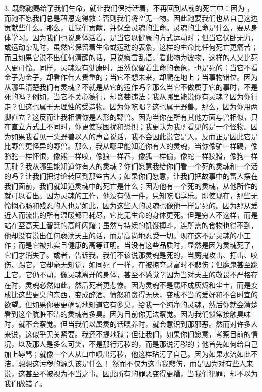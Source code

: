 3. 既然祂赐给了我们生命，就让我们保持活着，不再回到从前的死亡中：因为 ，而祂不愿我们总是藉恩宠得救：否则我们将空无一物。因此祂要我们也从自己这边贡献些什么。那么，让我们贡献，并保全灵魂的生命。灵魂的生命是什么，要从身体学习。因为我们也说身体活着，是当它以健康的方式运动时；但当它伏卧无力，或运动杂乱时，虽然它保留着生命或运动的表象，这样的生命比任何死亡更痛苦；而且如果它说不出任何清醒的话，只说疯言乱语，看此物为彼物，这样的人又比死人更可怜。同样，灵魂没有健康时，虽然保留着生命的表象，也是死的：当它不看金子为金子，却看作伟大贵重的；当它不想未来，却爬在地上；当事物错位。因为从哪里清楚我们有灵魂？不就是从它的运作吗？那么当它不做属于它的事时，不是死的吗？例如，当它不关心德行，却贪婪违法；我从哪里能说你有灵魂？因为你行走？但这也属于无理性的受造物。因为你吃喝？这也属于野兽。那么，因为你用两脚直立？这反而让我相信你是人形的野兽。因为当你在所有其他方面与兽相似，只在直立方式上不同时，你更使我困扰和恐惧；我更认为我所看见的是一个怪物。因为如果我看见一头野兽以人的声音说话，我不会因此说它是人，反而正是因此它是比野兽更怪异的野兽。那么，我从哪里能知道你有人的灵魂，当你像驴一样踢，像骆驼一样怀恨，像熊一样咬，像狼一样吞，像狐一样偷，像蛇一样狡猾，像狗一样无耻？我从哪里能知道你有人的灵魂？你们愿意我给你们看一个死的灵魂和一个活的吗？让我们把讨论转回到那些古人；如果你们愿意，让我们把故事中的富人摆在我们面前，我们就知道灵魂中的死亡是什么；因为他有一个死的灵魂，从他所作的就可以看出。因为灵魂的工作，他没有做一件，只知吃喝享乐。即使现在，那些无怜悯心肠和残忍的人也是如此，因为这些人的灵魂也像他一样是死的。因为那从爱近人而流出的所有温暖都已耗尽，它比无生命的身体更死。但是穷人不这样，而是站在至高天上智慧的高峰闪耀；虽然与持续的饥饿搏斗，连所需的食物也得不到，他却没有说出任何亵渎天主的话，而是高尚地忍受一切。现在这不是灵魂的小工作；而是它被扎实且健康的高等证明。当没有这些品质时，显然是因为灵魂死了，它们才消失了。或者，告诉我，我们不该说那灵魂是死的，当魔鬼攻击、打击、咬伤、踢它，它却毫无知觉，如同死了一样，在被掠夺财富时不悲伤；但魔鬼甚至跳上它，它仍不动，像灵魂离开的身体，甚至不感觉？因为当对天主的敬畏不严格存在时，灵魂必然如此，然后死者更悲惨。因为灵魂不是腐坏成灰烬和尘土，而是变成比这些更臭的东西，变成醉酒、愤怒和贪得无厌，变成不当的爱好和不合时宜的欲望。但如果你要更确切地知道它有多臭，给我一个纯净的灵魂，然后你就会清楚看到这个肮脏不洁的灵魂有多臭。因为目前你无法察觉。因为我们惯常接触臭味时，就不会察觉。但当我们以属灵的话喂养时，就会意识到那邪恶。然而对许多人来说，这似乎无关紧要。我还不提地狱；但让我们，如果你们愿意，考察目前的情况，以及那人是多么可笑，不是那行污秽的，而是那说污秽的；他首先如何给自己加上辱骂；就像一个人从口中喷出污秽，他这样玷污了自己。因为如果水流如此不洁，想想这污秽的源头该是什么！  然而不仅为这事我悲伤，而是因为对有些人来说，这甚至不被视为不当之事。因此所有的罪恶变得更糟，当我们犯罪，却不以为我们做错了。\par

